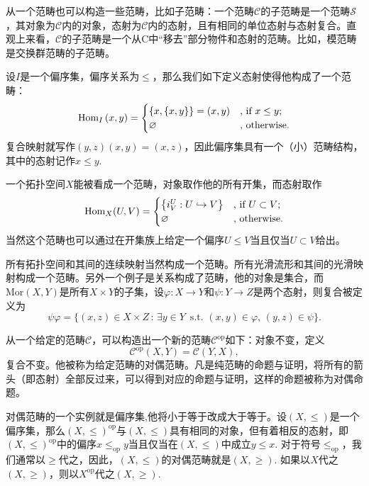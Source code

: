 从一个范畴也可以构造一些范畴，比如子范畴：一个范畴$\mathcal{C}$的子范畴是一个范畴$\mathcal{S}$，其对象为$\mathcal{C}$内的对象，态射为$\mathcal{C}$内的态射，且有相同的单位态射与态射复合。直观上来看，$\mathcal{C}$的子范畴是一个从C中“移去”部分物件和态射的范畴。比如，模范畴是交换群范畴的子范畴。

\para 设$I$是一个偏序集，偏序关系为$\leq$，那么我们如下定义态射使得他构成了一个范畴：
\[
	\operatorname{Hom}_{I}\left(x,y\right)=\begin{cases}
	\{x,\{x,y\}\}=(x,y)&\text{, if }x\leq y\text{;}\\
	\varnothing&\text{, otherwise}.
	\end{cases}
\]
复合映射就写作$(y,z)(x,y)=(x,z)$，因此偏序集具有一个（小）范畴结构，其中的态射记作$x\leq y$.

一个拓扑空间$X$能被看成一个范畴，对象取作他的所有开集，而态射取作
\[
	\operatorname{Hom}_{X}(U,V)=\begin{cases}
	\bigl\{i^U_V:U\hookrightarrow V\bigr\}&\text{, if }U\subset V\text{;}\\
	\varnothing&\text{, otherwise}.
	\end{cases}
\]
当然这个范畴也可以通过在开集族上给定一个偏序$U\leq V$当且仅当$U\subset V$给出。

所有拓扑空间和其间的连续映射当然构成一个范畴。所有光滑流形和其间的光滑映射构成一个范畴。另外一个例子是关系构成了范畴，他的对象是集合，而$\text{Mor}(X,Y)$是所有$X\times Y$的子集，设$\varphi:X\to Y$和$\psi:Y\to Z$是两个态射，则复合被定义为
\[
	\psi\varphi=\bigl\{(x,z)\in X\times Z\,:\,\exists y\in Y\,\text{ s.t. } (x,y)\in\varphi,\, (y,z)\in \psi\bigr\}.
\]

\para 从一个给定的范畴$\mathcal{C}$，可以构造出一个新的范畴$\mathcal{C}^{\mathrm{op}}$如下：对象不变，定义
\[\mathcal{C}^{\mathrm{op}}(X,Y)=\mathcal{C}(Y,X),\]复合不变。他被称为给定范畴的对偶范畴。凡是纯范畴的命题与证明，将所有的箭头（即态射）全部反过来，可以得到对应的命题与证明，这样的命题被称为对偶命题。

对偶范畴的一个实例就是偏序集,他将小于等于改成大于等于。设$(X,\leq)$是一个偏序集，那么$(X,\leq)^\text{op}$与$(X,\leq)$具有相同的对象，但有着相反的态射，即$(X,\leq)^\text{op}$中的偏序$x\leq_{\text{op}} y$当且仅当在$(X,\leq)$中成立$y\leq x$. 对于符号$\leq_{\text{op}}$，我们通常以$\geq$代之，因此，$(X,\leq)$的对偶范畴就是$(X,\geq)$. 如果以$X$代之$(X,\geq)$，则以$X^{\text{op}}$代之$(X,\geq)$.

